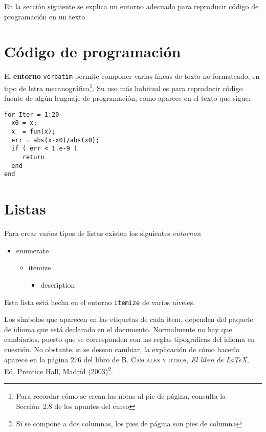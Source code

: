 \documentclass[a4paper,twocolumn]{report}
\begin{document}
En la sección siguiente se explica un entorno adecuado para reproducir código de programación en un texto.
\section*{Código de programación}


El \textbf{entorno} \texttt{verbatim} permite componer varias líneas de texto no formateado, en tipo de letra mecanográfica\footnote{Para recordar cómo se crean las notas al pie de página, consulta la Sección~2.8 de los apuntes del curso}. Su uso más habitual es para reproducir código fuente de algún lenguaje de programación, como aparece en el texto que sigue: 
%
\begin{verbatim}
for Iter = 1:20
  x0 = x;
  x  = fun(x);
  err = abs(x-x0)/abs(x0);
  if ( err < 1.e-9 )
     return
  end
end
\end{verbatim}




\section*{Listas}


Para crear varios tipos de listas existen los siguientes \textit{entornos}:

{\ttfamily
\begin{itemize}
\item enumerate
\begin{itemize}
\item itemize
\begin{itemize}
\item description
\end{itemize}
\end{itemize}
\end{itemize}
}

Esta lista está hecha en el entorno \texttt{itemize} de varios niveles. 

Los símbolos que aparecen en las etiquetas de cada item, dependen del paquete de idioma que está declarado en el documento. Normalmente no hay que cambiarlos, puesto que se corresponden con las reglas tipográficas del idioma en cuestión. No obstante, si se desean cambiar, la explicación de cómo hacerlo aparece en la página 276 del libro de
\textsc{B. Cascales y otros}, \textit{El libro de \LaTeX{}},  Ed. Prentice Hall, Madrid (2003)\footnote{Si  se compone a dos columnas, los pies de página son pies de columna}.
\end{document}
